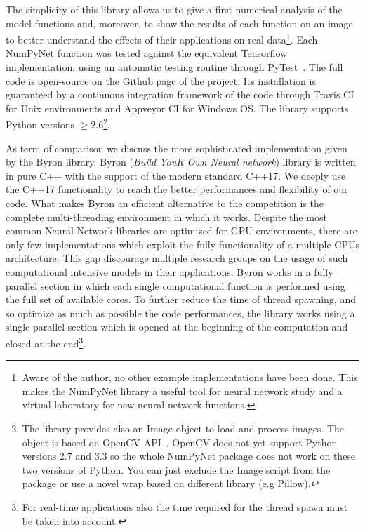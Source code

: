 \documentclass{standalone}
\begin{document}
The simplicity of this library allows us to give a first numerical analysis of the model functions and, moreover, to show the results of each function on an image to better understand the effects of their applications on real data\footnote{
  Aware of the author, no other example implementations have been done.
  This makes the \textsf{NumPyNet} library a useful tool for neural network study and a virtual laboratory for new neural network functions.
}.
Each \textsf{NumPyNet} function was tested against the equivalent \textsf{Tensorflow} implementation, using an automatic testing routine through \textsf{PyTest}~\cite{Okken:2017:PTP:3176124}.
The full code is open-source on the \textsf{Github} page of the project.
Its installation is guaranteed by a continuous integration framework of the code through \textsf{Travis CI} for Unix environments and \textsf{Appveyor CI} for Windows OS.
The library supports \textsf{Python} versions $\ge2.6$\footnote{
  The library provides also an \textsf{Image} object to load and process images.
  The object is based on \textsf{OpenCV} API~\cite{OpenCV}.
  \textsf{OpenCV} does not yet support \textsf{Python} versions 2.7 and 3.3 so the whole \textsf{NumPyNet} package does not work on these two versions of \textsf{Python}.
  You can just exclude the \textsf{Image} script from the package or use a novel wrap based on different library (e.g \textsf{Pillow}).
}.

As term of comparison we discuss the more sophisticated implementation given by the \textsf{Byron} library.
\textsf{Byron} (\emph{Build YouR Own Neural network}) library is written in pure \textsf{C++} with the support of the modern standard \textsf{C++17}.
We deeply use the \textsf{C++17} functionality to reach the better performances and flexibility of our code.
What makes \textsf{Byron} an efficient alternative to the competition is the complete multi-threading environment in which it works.
Despite the most common Neural Network libraries are optimized for GPU environments, there are only few implementations which exploit the fully functionality of a multiple CPUs architecture.
This gap discourage multiple research groups on the usage of such computational intensive models in their applications.
\textsf{Byron} works in a fully parallel section in which each single computational function is performed using the full set of available cores.
To further reduce the time of thread spawning, and so optimize as much as possible the code performances, the library works using a single parallel section which is opened at the beginning of the computation and closed at the end\footnote{
  For real-time applications also the time required for the thread spawn must be taken into account.
}.
\end{document}
